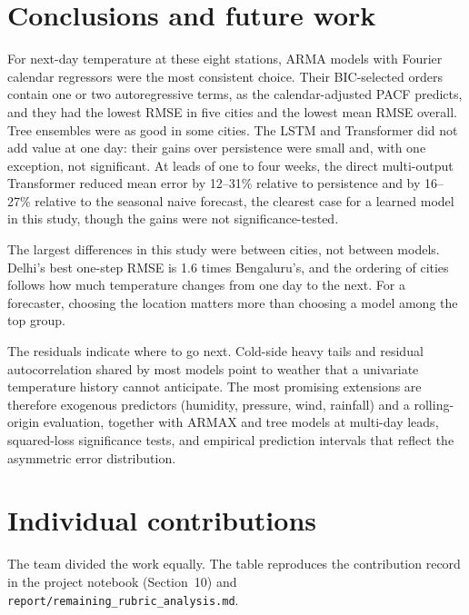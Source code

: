 \documentclass[11pt,a4paper]{article}
\newcommand{\code}[1]{\texttt{#1}}
\begin{document}
\section{Conclusions and future work}
\label{sec:conclusion}

For next-day temperature at these eight stations, ARMA models with Fourier calendar regressors were the most consistent choice. Their BIC-selected orders contain one or two autoregressive terms, as the calendar-adjusted PACF predicts, and they had the lowest RMSE in five cities and the lowest mean RMSE overall. Tree ensembles were as good in some cities. The LSTM and Transformer did not add value at one day: their gains over persistence were small and, with one exception, not significant. At leads of one to four weeks, the direct multi-output Transformer reduced mean error by 12--31\% relative to persistence and by 16--27\% relative to the seasonal naive forecast, the clearest case for a learned model in this study, though the gains were not significance-tested.

The largest differences in this study were between cities, not between models. Delhi's best one-step RMSE is 1.6 times Bengaluru's, and the ordering of cities follows how much temperature changes from one day to the next. For a forecaster, choosing the location matters more than choosing a model among the top group.

The residuals indicate where to go next. Cold-side heavy tails and residual autocorrelation shared by most models point to weather that a univariate temperature history cannot anticipate. The most promising extensions are therefore exogenous predictors (humidity, pressure, wind, rainfall) and a rolling-origin evaluation, together with ARMAX and tree models at multi-day leads, squared-loss significance tests, and empirical prediction intervals that reflect the asymmetric error distribution.

\section{Individual contributions}
\label{sec:contrib}

The team divided the work equally. The table reproduces the contribution record in the project notebook (Section~10) and \code{report/remaining\_rubric\_analysis.md}.
\end{document}
